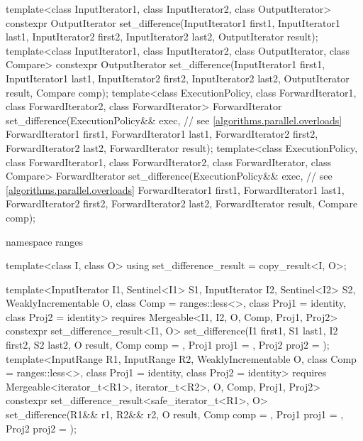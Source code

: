 \begin{codeblock}
{  template<class InputIterator1, class InputIterator2, class OutputIterator>
    constexpr OutputIterator
      set_difference(InputIterator1 first1, InputIterator1 last1,
                     InputIterator2 first2, InputIterator2 last2,
                     OutputIterator result);
  template<class InputIterator1, class InputIterator2, class OutputIterator, class Compare>
    constexpr OutputIterator
      set_difference(InputIterator1 first1, InputIterator1 last1,
                     InputIterator2 first2, InputIterator2 last2,
                     OutputIterator result, Compare comp);
  template<class ExecutionPolicy, class ForwardIterator1, class ForwardIterator2,
           class ForwardIterator>
    ForwardIterator
      set_difference(ExecutionPolicy&& exec, // see \ref{algorithms.parallel.overloads}
                     ForwardIterator1 first1, ForwardIterator1 last1,
                     ForwardIterator2 first2, ForwardIterator2 last2,
                     ForwardIterator result);
  template<class ExecutionPolicy, class ForwardIterator1, class ForwardIterator2,
           class ForwardIterator, class Compare>
    ForwardIterator
      set_difference(ExecutionPolicy&& exec, // see \ref{algorithms.parallel.overloads}
                     ForwardIterator1 first1, ForwardIterator1 last1,
                     ForwardIterator2 first2, ForwardIterator2 last2,
                     ForwardIterator result, Compare comp);

  namespace ranges {
    template<class I, class O>
    using set_difference_result = copy_result<I, O>;

    template<InputIterator I1, Sentinel<I1> S1, InputIterator I2, Sentinel<I2> S2,
             WeaklyIncrementable O, class Comp = ranges::less<>,
             class Proj1 = identity, class Proj2 = identity>
      requires Mergeable<I1, I2, O, Comp, Proj1, Proj2>
      constexpr set_difference_result<I1, O>
        set_difference(I1 first1, S1 last1, I2 first2, S2 last2, O result,
                       Comp comp = {}, Proj1 proj1 = {}, Proj2 proj2 = {});
    template<InputRange R1, InputRange R2, WeaklyIncrementable O,
             class Comp = ranges::less<>, class Proj1 = identity, class Proj2 = identity>
      requires Mergeable<iterator_t<R1>, iterator_t<R2>, O, Comp, Proj1, Proj2>
      constexpr set_difference_result<safe_iterator_t<R1>, O>
        set_difference(R1&& r1, R2&& r2, O result,
                       Comp comp = {}, Proj1 proj1 = {}, Proj2 proj2 = {});
  }

}
\end{codeblock}
